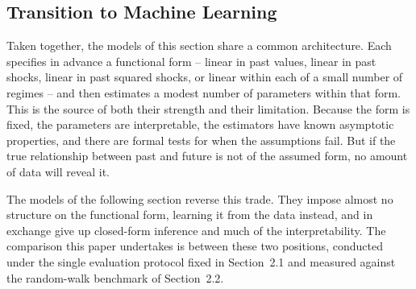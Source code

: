 \documentclass[12pt,a4paper]{article}
\begin{document}
\subsection{Transition to Machine Learning}

Taken together, the models of this section share a common architecture. Each
specifies in advance a functional form -- linear in past values, linear in past
shocks, linear in past squared shocks, or linear within each of a small number
of regimes -- and then estimates a modest number of parameters within that
form. This is the source of both their strength and their limitation. Because
the form is fixed, the parameters are interpretable, the estimators have known
asymptotic properties, and there are formal tests for when the assumptions
fail. But if the true relationship between past and future is not of the
assumed form, no amount of data will reveal it.

The models of the following section reverse this trade. They impose almost no
structure on the functional form, learning it from the data instead, and in
exchange give up closed-form inference and much of the interpretability. The
comparison this paper undertakes is between these two positions, conducted
under the single evaluation protocol fixed in Section~2.1 and measured against
the random-walk benchmark of Section~2.2.



\end{document}
